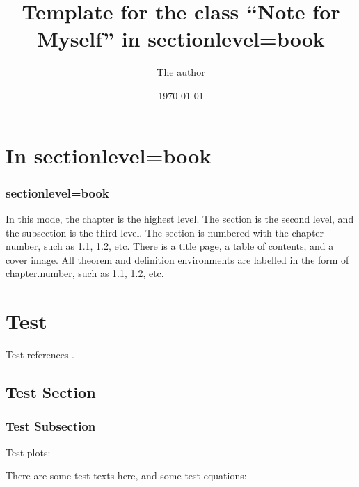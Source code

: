 \documentclass[sectionlevel=book]{noteformyself}
\title{Template for the class ``Note for Myself'' in sectionlevel=book}
\author{The author}
\date{\today}
\begin{document}
    \maketitle

    \tableofcontents %

    \chapter{In sectionlevel=book}


        \subsection{sectionlevel=book}


        In this mode, the chapter is the highest level.
        The section is the second level, and the subsection is the third level.
        The section is numbered with the chapter number, such as 1.1, 1.2, etc.
        There is a title page, a table of contents, and a cover image.
        All theorem and definition environments are labelled in the form of chapter.number, such as 1.1, 1.2, etc.

    \chapter{Test}

        Test references \cite{Har77}.


        \section{Test Section}

        \subsection{Test Subsection}

        Test plots:

        \begin{figure}[htbp]
            \begin{center}
                
            \end{center}
        \end{figure}

        There are some test texts here, and some test equations:

    \printbibliography[heading=bibintoc, title={References}] %
\end{document}

